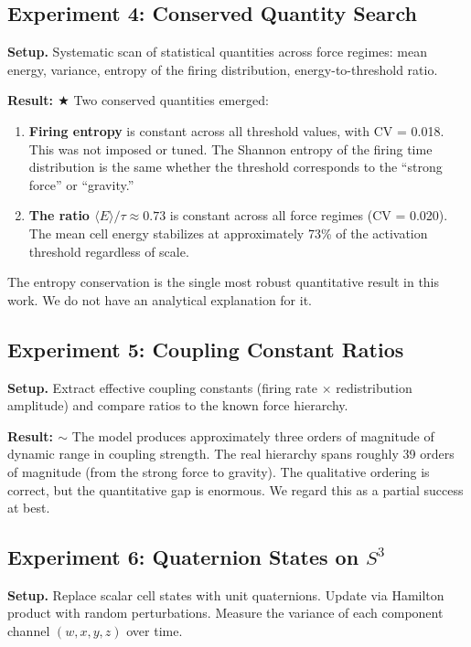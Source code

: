 \documentclass[letterpaper,12pt]{article}
\begin{document}
\subsection{Experiment 4: Conserved Quantity Search}

\textbf{Setup.} Systematic scan of statistical quantities across force regimes: mean energy, variance, entropy of the firing distribution, energy-to-threshold ratio.

\textbf{Result: $\bigstar$} Two conserved quantities emerged:

\begin{enumerate}
  \item \textbf{Firing entropy} is constant across all threshold values, with CV = 0.018. This was not imposed or tuned. The Shannon entropy of the firing time distribution is the same whether the threshold corresponds to the ``strong force'' or ``gravity.''

  \item \textbf{The ratio $\langle E \rangle / \tau \approx 0.73$} is constant across all force regimes (CV = 0.020). The mean cell energy stabilizes at approximately 73\% of the activation threshold regardless of scale.
\end{enumerate}

The entropy conservation is the single most robust quantitative result in this work. We do not have an analytical explanation for it.

\subsection{Experiment 5: Coupling Constant Ratios}

\textbf{Setup.} Extract effective coupling constants (firing rate $\times$ redistribution amplitude) and compare ratios to the known force hierarchy.

\textbf{Result: $\sim$} The model produces approximately three orders of magnitude of dynamic range in coupling strength. The real hierarchy spans roughly 39 orders of magnitude (from the strong force to gravity). The qualitative ordering is correct, but the quantitative gap is enormous. We regard this as a partial success at best.

\subsection{Experiment 6: Quaternion States on $S^3$}

\textbf{Setup.} Replace scalar cell states with unit quaternions. Update via Hamilton product with random perturbations. Measure the variance of each component channel $(w, x, y, z)$ over time.
\end{document}
